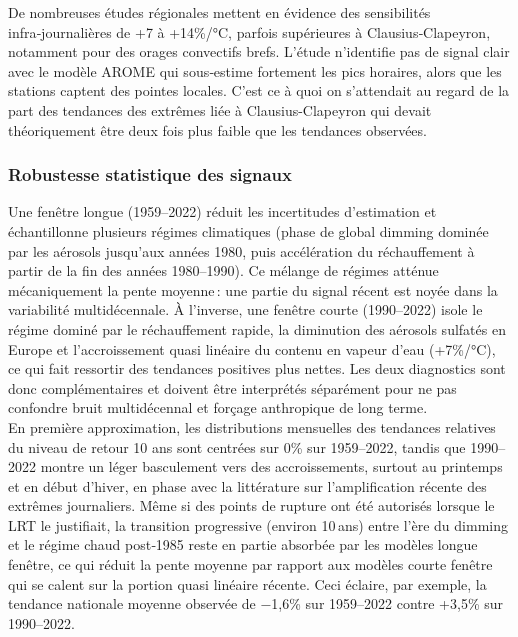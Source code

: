 \documentclass[
  article,
  nofooter,
  noheadings]{jss}
\begin{document}
De nombreuses études régionales mettent en évidence des sensibilités
infra‑journalières de +7 à +14\%/°C, parfois supérieures à
Clausius‑Clapeyron, notamment pour des orages convectifs brefs. L'étude
n'identifie pas de signal clair avec le modèle AROME qui sous‑estime
fortement les pics horaires, alors que les stations captent des pointes
locales. C'est ce à quoi on s'attendait au regard de la part des
tendances des extrêmes liée à Clausius-Clapeyron qui devait
théoriquement être deux fois plus faible que les tendances observées.

\subsubsection{Robustesse statistique des
signaux}\label{robustesse-statistique-des-signaux}

Une fenêtre longue (1959--2022) réduit les incertitudes d'estimation et
échantillonne plusieurs régimes climatiques (phase de global dimming
dominée par les aérosols jusqu'aux années 1980, puis accélération du
réchauffement à partir de la fin des années 1980--1990). Ce mélange de
régimes atténue mécaniquement la pente moyenne\,: une partie du signal
récent est noyée dans la variabilité multidécennale. À l'inverse, une
fenêtre courte (1990--2022) isole le régime dominé par le réchauffement
rapide, la diminution des aérosols sulfatés en Europe et l'accroissement
quasi linéaire du contenu en vapeur d'eau (+7\%/°C), ce qui fait
ressortir des tendances positives plus nettes. Les deux diagnostics sont
donc complémentaires et doivent être interprétés séparément pour ne pas
confondre bruit multidécennal et forçage anthropique de long terme.\\

En première approximation, les distributions mensuelles des tendances
relatives du niveau de retour 10 ans sont centrées sur 0\% sur
1959--2022, tandis que 1990--2022 montre un léger basculement vers des
accroissements, surtout au printemps et en début d'hiver, en phase avec
la littérature sur l'amplification récente des extrêmes journaliers.
Même si des points de rupture ont été autorisés lorsque le LRT le
justifiait, la transition progressive (environ 10\,ans) entre l'ère du
dimming et le régime chaud post‑1985 reste en partie absorbée par les
modèles longue fenêtre, ce qui réduit la pente moyenne par rapport aux
modèles courte fenêtre qui se calent sur la portion quasi linéaire
récente. Ceci éclaire, par exemple, la tendance nationale moyenne
observée de −1,6\% sur 1959--2022 contre +3,5\% sur 1990--2022.\\
\end{document}
